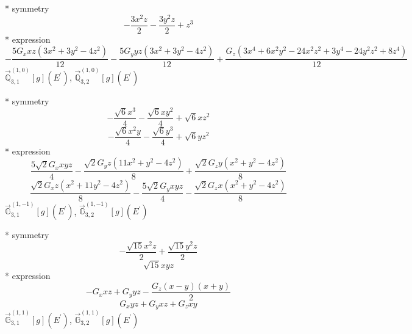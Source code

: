 \documentclass[fleqn,8pt]{jsarticle}
\begin{document}
\noindent\quad ** symmetry
\begin{dmath*}
- \frac{3 x^{2} z}{2} - \frac{3 y^{2} z}{2} + z^{3}
\end{dmath*}
\noindent\quad ** expression
\begin{dmath*}
- \frac{5 G_{x} x z \left(3 x^{2} + 3 y^{2} - 4 z^{2}\right)}{12} - \frac{5 G_{y} y z \left(3 x^{2} + 3 y^{2} - 4 z^{2}\right)}{12} + \frac{G_{z} \left(3 x^{4} + 6 x^{2} y^{2} - 24 x^{2} z^{2} + 3 y^{4} - 24 y^{2} z^{2} + 8 z^{4}\right)}{12}
\end{dmath*}
\noindent\quad $\vec{\mathbb{Q}}_{3,1}^{(1,0)}[g](E^{\prime})$, $\vec{\mathbb{Q}}_{3,2}^{(1,0)}[g](E^{\prime})$

\noindent\quad ** symmetry
\begin{dmath*}
- \frac{\sqrt{6} x^{3}}{4} - \frac{\sqrt{6} x y^{2}}{4} + \sqrt{6} x z^{2}
\end{dmath*}
\begin{dmath*}
- \frac{\sqrt{6} x^{2} y}{4} - \frac{\sqrt{6} y^{3}}{4} + \sqrt{6} y z^{2}
\end{dmath*}
\noindent\quad ** expression
\begin{dmath*}
\frac{5 \sqrt{2} G_{x} x y z}{4} - \frac{\sqrt{2} G_{y} z \left(11 x^{2} + y^{2} - 4 z^{2}\right)}{8} + \frac{\sqrt{2} G_{z} y \left(x^{2} + y^{2} - 4 z^{2}\right)}{8}
\end{dmath*}
\begin{dmath*}
\frac{\sqrt{2} G_{x} z \left(x^{2} + 11 y^{2} - 4 z^{2}\right)}{8} - \frac{5 \sqrt{2} G_{y} x y z}{4} - \frac{\sqrt{2} G_{z} x \left(x^{2} + y^{2} - 4 z^{2}\right)}{8}
\end{dmath*}
\noindent\quad $\vec{\mathbb{G}}_{3,1}^{(1,-1)}[g](E^{\prime})$, $\vec{\mathbb{G}}_{3,2}^{(1,-1)}[g](E^{\prime})$

\noindent\quad ** symmetry
\begin{dmath*}
- \frac{\sqrt{15} x^{2} z}{2} + \frac{\sqrt{15} y^{2} z}{2}
\end{dmath*}
\begin{dmath*}
\sqrt{15} x y z
\end{dmath*}
\noindent\quad ** expression
\begin{dmath*}
- G_{x} x z + G_{y} y z - \frac{G_{z} \left(x - y\right) \left(x + y\right)}{2}
\end{dmath*}
\begin{dmath*}
G_{x} y z + G_{y} x z + G_{z} x y
\end{dmath*}
\noindent\quad $\vec{\mathbb{G}}_{3,1}^{(1,1)}[g](E^{\prime})$, $\vec{\mathbb{G}}_{3,2}^{(1,1)}[g](E^{\prime})$
\end{document}
